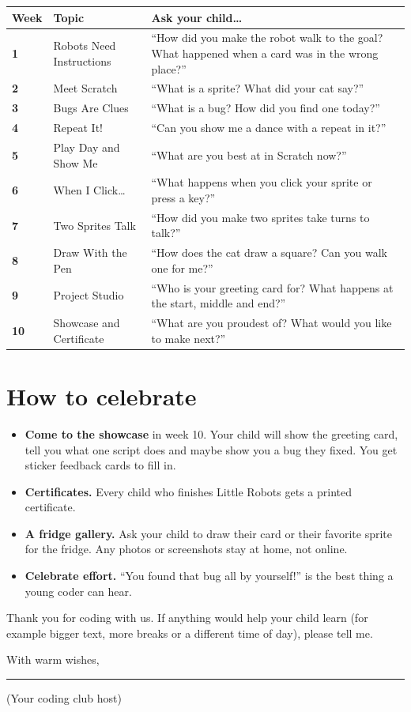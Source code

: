 \documentclass[track=junior,level=1]{kidscode}
\begin{document}
\begin{center}\small\renewcommand{\arraystretch}{1.45}
\begin{tabularx}{\linewidth}{@{}>{\bfseries}p{1.0cm}>{\RaggedRight}p{4.2cm}>{\RaggedRight\arraybackslash}X@{}}
\toprule
Week & Topic & Ask your child\dots\\
\midrule
1 & Robots Need Instructions & \enquote{How did you make the robot walk to the goal? What happened when a card was in the wrong place?}\\
2 & Meet Scratch & \enquote{What is a sprite? What did your cat say?}\\
3 & Bugs Are Clues & \enquote{What is a bug? How did you find one today?}\\
4 & Repeat It! & \enquote{Can you show me a dance with a repeat in it?}\\
5 & Play Day and Show Me & \enquote{What are you best at in Scratch now?}\\
6 & When I Click\dots & \enquote{What happens when you click your sprite or press a key?}\\
7 & Two Sprites Talk & \enquote{How did you make two sprites take turns to talk?}\\
8 & Draw With the Pen & \enquote{How does the cat draw a square? Can you walk one for me?}\\
9 & Project Studio & \enquote{Who is your greeting card for? What happens at the start, middle and end?}\\
10 & Showcase and Certificate & \enquote{What are you proudest of? What would you like to make next?}\\
\bottomrule
\end{tabularx}
\end{center}

\section{How to celebrate}
\begin{itemize}[itemsep=3pt]
  \item \textbf{Come to the showcase} in week 10. Your child will show the greeting card, tell you what
        one script does and maybe show you a bug they fixed. You get sticker feedback cards to fill in.
  \item \textbf{Certificates.} Every child who finishes Little Robots gets a printed certificate.
  \item \textbf{A fridge gallery.} Ask your child to draw their card or their favorite sprite for the fridge.
        Any photos or screenshots stay at home, not online.
  \item \textbf{Celebrate effort.} \enquote{You found that bug all by yourself!} is the best thing a
        young coder can hear.
\end{itemize}

\bigskip
Thank you for coding with us. If anything would help your child learn (for example bigger text,
more breaks or a different time of day), please tell me.

\bigskip
With warm wishes,\par\bigskip
\rule{6cm}{0.4pt}\par
{\small (Your coding club host)}
\end{document}
